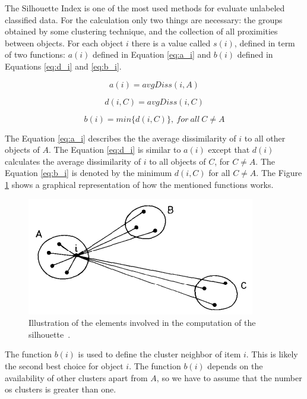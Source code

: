 \documentclass[conference,compsoc]{IEEEtran}
\begin{document}
The Silhouette Index is one of the most used methods for evaluate unlabeled classified data. For the calculation only two things are necessary: the groups obtained by some clustering technique, and the collection of all proximities between objects. For each object $i$ there is a value called $s(i)$, defined in term of two functions: $a(i)$ defined in Equation \ref{eq:a_i} and $b(i)$ defined in Equations \ref{eq:d_i} and \ref{eq:b_i}.


\begin{equation} \label{eq:a_i}
	a(i) = avgDiss(i, A)
\end{equation}


\begin{equation} \label{eq:d_i}
	d(i, C) = avgDiss(i, C)
\end{equation}


\begin{equation} \label{eq:b_i}
	b(i) = min\{d(i, C)\},~for~all~C \neq A
\end{equation}


The Equation \ref{eq:a_i} describes the the average dissimilarity of $i$ to all other objects of $A$. The Equation \ref{eq:d_i} is similar to $a(i)$ except that $d(i)$ calculates the average dissimilarity of $i$ to all objects of $C$, for $C \neq A$. The Equation \ref{eq:b_i} is denoted by the minimum $d(i, C)$ for all $C \neq A$. The Figure \ref{fig:silhouette} shows a graphical representation of how the mentioned functions works.


\begin{figure}[!htb]
	\centering
	\includegraphics[scale=.6]{figures/silhouette_img.png}
	\caption{Illustration of the elements involved in the computation of the silhouette~\cite{rousseeuw1987silhouettes}.}
	\label{fig:silhouette}
\end{figure}


The function $b(i)$ is used to define the cluster neighbor of item $i$. This is likely the second best choice for object $i$. The function $b(i)$ depends on the availability of other clusters apart from $A$, so we have to assume that the number os clusters is greater than one.
\end{document}
